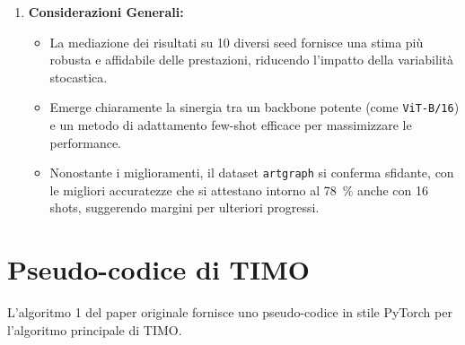 \documentclass[11pt,a4paper]{article}
\begin{document}
\begin{enumerate}
    \item \textbf{Considerazioni Generali:}
    \begin{itemize}[label=\textbullet, leftmargin=*]
        \item La mediazione dei risultati su 10 diversi seed fornisce una stima più robusta e affidabile delle prestazioni, riducendo l'impatto della variabilità stocastica.
        \item Emerge chiaramente la sinergia tra un backbone potente (come \texttt{ViT-B/16}) e un metodo di adattamento few-shot efficace per massimizzare le performance.
        \item Nonostante i miglioramenti, il dataset \texttt{artgraph} si conferma sfidante, con le migliori accuratezze che si attestano intorno al \SI{78}{\percent} anche con 16 shots, suggerendo margini per ulteriori progressi.
    \end{itemize}
\end{enumerate}



\newpage
\appendix
\section{Pseudo-codice di TIMO}
L'algoritmo 1 del paper originale fornisce uno pseudo-codice in stile PyTorch per l'algoritmo principale di TIMO.
\end{document}
